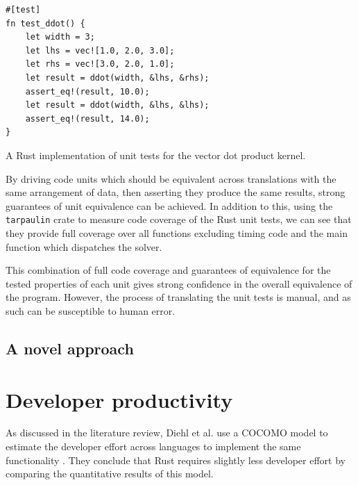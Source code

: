 \begin{listing}[H]
    \begin{verbatim}
#[test]
fn test_ddot() {
    let width = 3;
    let lhs = vec![1.0, 2.0, 3.0];
    let rhs = vec![3.0, 2.0, 1.0];
    let result = ddot(width, &lhs, &rhs);
    assert_eq!(result, 10.0);
    let result = ddot(width, &lhs, &lhs);
    assert_eq!(result, 14.0);
}
    \end{verbatim}
    \caption{A Rust implementation of unit tests for the vector dot product kernel.}
    \label{listing:rust-ddot-unit-test}
\end{listing}

By driving code units which should be equivalent across translations with the same arrangement of data, then asserting they produce the same results, strong guarantees of unit equivalence can be achieved. In addition to this, using the \texttt{tarpaulin} crate \cite{xd009642Xd009642Tarpaulin2024} to measure code coverage of the Rust unit tests, we can see that they provide full coverage over all functions excluding timing code and the main function which dispatches the solver. 

This combination of full code coverage and guarantees of equivalence for the tested properties of each unit gives strong confidence in the overall equivalence of the program. However, the process of translating the unit tests is manual, and as such can be susceptible to human error.

\subsection{A novel approach}
\label{sec:equivalence-polyglotest}







\section{Developer productivity}
\label{sec:developer-productivity}

As discussed in the literature review, Diehl et al. use a COCOMO model to estimate the developer effort across languages to implement the same functionality \cite{diehlBenchmarkingParallel1D2023}. They conclude that Rust requires slightly less developer effort by comparing the quantitative results of this model.


